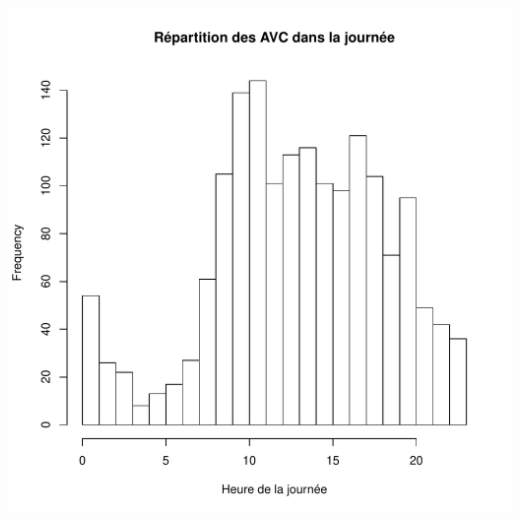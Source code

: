 \documentclass[12pt,english,french,twoside]{report}\usepackage[]{graphicx}\usepackage[]{color}
\makeatletter
\def\maxwidth{ %
  \ifdim\Gin@nat@width>\linewidth
    \linewidth
  \else
    \Gin@nat@width
  \fi
}
\newenvironment{knitrout}{}{} %
\makeatother
\begin{document}
\begin{knitrout}
\color{fgcolor}
\includegraphics[width=\maxwidth]{figure/heure_avc1} 


\end{knitrout}
\end{document}
